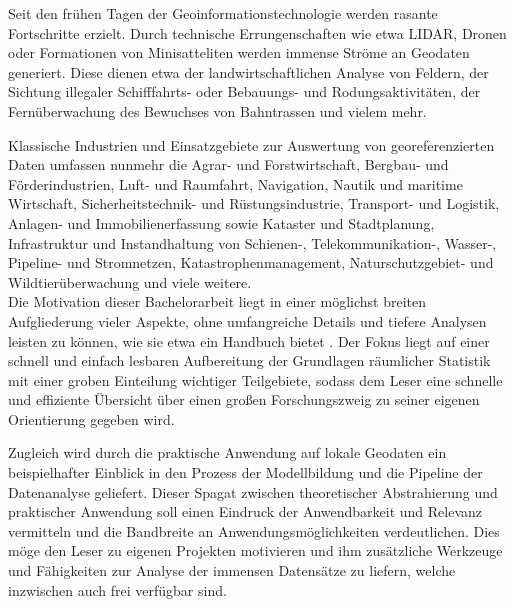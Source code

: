 Seit den frühen Tagen der Geoinformationstechnologie werden rasante Fortschritte erzielt.
Durch technische Errungenschaften wie etwa LIDAR, Dronen oder Formationen von Minisatteliten werden immense Ströme an Geodaten generiert.
Diese dienen etwa der landwirtschaftlichen Analyse von Feldern, der Sichtung illegaler Schifffahrts- oder Bebauungs- und Rodungsaktivitäten, 
der Fernüberwachung des Bewuchses von Bahntrassen und vielem mehr. 

Klassische Industrien und Einsatzgebiete zur Auswertung von georeferenzierten Daten umfassen nunmehr die Agrar- und Forstwirtschaft, 
Bergbau- und Förderindustrien, Luft- und Raumfahrt, Navigation, Nautik und maritime Wirtschaft, 
Sicherheitstechnik- und Rüstungsindustrie, Transport- und Logistik, Anlagen- und Immobilienerfassung sowie Kataster und Stadtplanung, 
Infrastruktur und Instandhaltung  von Schienen-, Telekommunikation-, Wasser-, Pipeline- und Stromnetzen, Katastrophenmanagement, 
Naturschutzgebiet- und Wildtierüberwachung und viele weitere. \\

Die Motivation dieser Bachelorarbeit liegt in einer möglichst breiten Aufgliederung vieler Aspekte, 
ohne umfangreiche Details und tiefere Analysen leisten zu können, wie sie etwa ein Handbuch bietet .  
Der Fokus liegt auf einer schnell und einfach lesbaren Aufbereitung der Grundlagen räumlicher Statistik mit einer groben Einteilung wichtiger Teilgebiete, 
sodass dem Leser eine schnelle und effiziente Übersicht über einen großen Forschungszweig zu seiner eigenen Orientierung gegeben wird.

Zugleich wird durch die praktische Anwendung auf lokale Geodaten ein beispielhafter Einblick 
in den Prozess der Modellbildung und die Pipeline der Datenanalyse geliefert. 
Dieser Spagat zwischen theoretischer Abstrahierung und praktischer Anwendung soll einen Eindruck der 
Anwendbarkeit und Relevanz vermitteln und die Bandbreite an Anwendungsmöglichkeiten verdeutlichen. 
Dies möge den Leser zu eigenen Projekten motivieren und ihm 
zusätzliche Werkzeuge und Fähigkeiten zur Analyse der immensen Datensätze zu liefern, welche inzwischen auch frei verfügbar sind.
